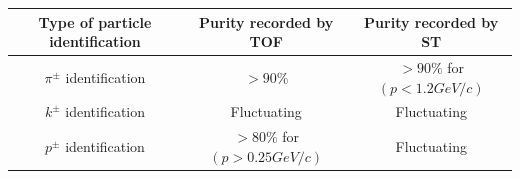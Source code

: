 \documentclass[12pt, twocolumn]{article}
\begin{document}
\clearpage




\begin{table}
\begin{tabular}{|c|c|c|}
\hline
Type of particle identification & Purity recorded by TOF & Purity recorded by ST \\
\hline
\hline
$\pi^{\pm}$ identification & $>90\%$ & $>90\%$ for $(p < 1.2GeV/c)$ \\
\hline
$k^{\pm}$ identification & Fluctuating & Fluctuating \\
\hline
$p^{\pm}$ identification & $>80\%$ for $(p > 0.25GeV/c)$ & Fluctuating \\
\hline
\end{tabular}
\label{Precision of momentum spectra recorded by tracking systems.} 
\end{table}
\end{document}
